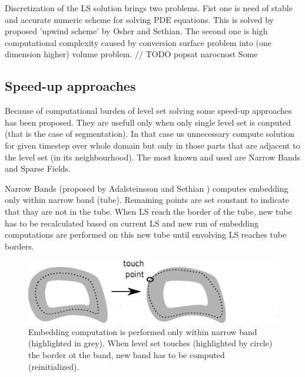 Discretization of the LS solution brings two problems. Fist one is need of stable and accurate numeric scheme for solving PDE equations. This is solved by proposed 'upwind scheme' by Osher and Sethian\cite{sethianLS}. The second one is high computational complexity caused by conversion surface problem into (one dimension higher) volume problem. 
// TODO popsat narocnost
Some 

\subsection{Speed-up approaches}

Because of computational burden of level set solving some speed-up approaches has been proposed. They are usefull only when only single level set is conputed (that is the case of segmentation). In that case us unnecessary compute solution for given timestep over whole domain but only in those parts that are adjacent to the level set (in its neighbourhood). The most known and used are Narrow Bands and Sparse Fields. 

Narrow Bands (proposed by Adalsteinsson and Sethian \cite{sethianFastLS}) computes embedding only within narrow band (tube). Remaining points are set constant to indicate that thay are not in the tube. When LS reach the border of the tube, new tube has to be recalculated based on current LS and new run of embedding computations are performed on this new tube until envolving LS reaches tube borders.

\begin{figure}
    \centering
    \includegraphics[width=14cm]{data/narrowBands.eps}
    \caption[Narrow bands computation illustration]{Embedding computation is performed only within narrow band (highlighted in grey). When level set touches (highlighted by circle) the border ot the band, new band has to be computed (reinitialized).}
    \label{fg:narrowBands}
\end{figure}

